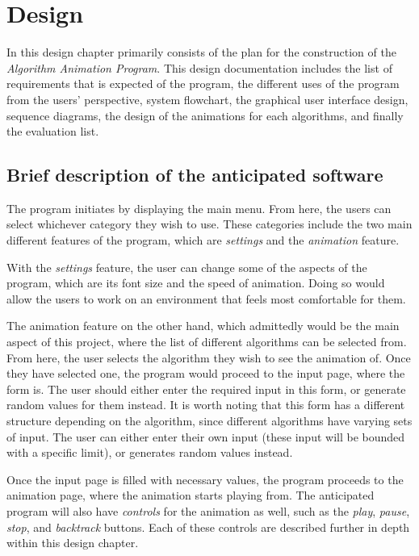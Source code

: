 \chapter{Design}

In this design chapter primarily consists of the plan for the construction of the \textit{Algorithm Animation Program}. This design documentation includes the list of requirements that is expected of the program, the different uses of the program from the users' perspective, system flowchart, the graphical user interface design, sequence diagrams, the design of the animations for each algorithms, and finally the evaluation list.

\section{Brief description of the anticipated software}
The program initiates by displaying the main menu. From here, the users can select whichever category they wish to use. These categories include the two main different features of the program, which are \textit{settings} and the \textit{animation} feature.

With the \textit{settings} feature, the user can change some of the aspects of the program, which are its font size and the speed of animation. Doing so would allow the users to work on an environment that feels most comfortable for them.

The animation feature on the other hand, which admittedly would be the main aspect of this project, where the list of different algorithms can be selected from. From here, the user selects the algorithm they wish to see the animation of. Once they have selected one, the program would proceed to the input page, where the form is. The user should either enter the required input in this form, or generate random values for them instead. It is worth noting that this form has a different structure depending on the algorithm, since different algorithms have varying sets of input. The user can either enter their own input (these input will be bounded with a specific limit), or generates random values instead. 

Once the input page is filled with necessary values, the program proceeds to the animation page, where the animation starts playing from. The anticipated program will also have \textit{controls} for the animation as well, such as the \textit{play}, \textit{pause}, \textit{stop}, and \textit{backtrack} buttons. Each of these controls are described further in depth within this design chapter.

